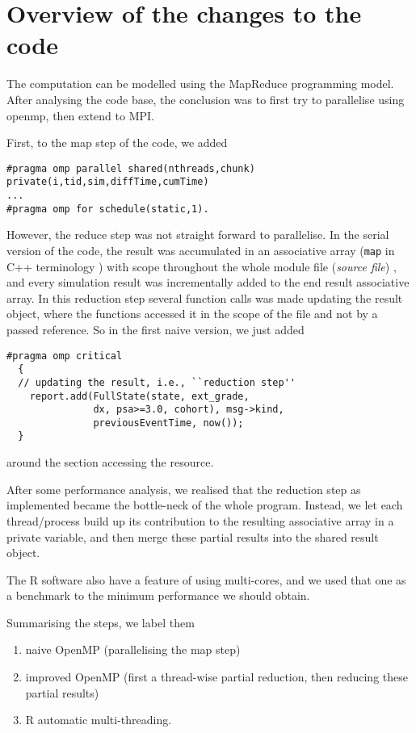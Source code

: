 
\section{Overview of the changes to the code}

The computation can be modelled using the MapReduce programming model. After
analysing the code base, the conclusion was to first try to
parallelise using openmp, then extend to MPI.

First, to the map step of the code, we added
\begin{lstlisting}
#pragma omp parallel shared(nthreads,chunk) private(i,tid,sim,diffTime,cumTime)
...
#pragma omp for schedule(static,1).
\end{lstlisting}
However, the reduce step was not straight forward to parallelise. In
the serial version of the code, the result was accumulated in an
associative array (\texttt{map} in C++ terminology ) with scope
throughout the whole module file (\emph{source file}) , and every
simulation result was incrementally added to the end result
associative array. In this reduction step several function calls was
made updating the result object, where the functions accessed it in
the scope of the file and not by a passed reference. So in the first
naive version, we just added \lstset{language=C++}
\begin{lstlisting}
#pragma omp critical
  {
  // updating the result, i.e., ``reduction step''
    report.add(FullState(state, ext_grade,
               dx, psa>=3.0, cohort), msg->kind,
               previousEventTime, now());
  }
\end{lstlisting}
around the section accessing the resource.

After some performance analysis, we realised that the reduction step
as implemented became the bottle-neck of the whole program. Instead,
we let each thread/process build up its contribution to the resulting
associative array in a private variable, and then merge these partial
results into the shared result object.

The R software also have a feature of using multi-cores, and we used
that one as a benchmark to the minimum performance we should obtain.

Summarising the steps, we label them
\begin{enumerate}
\item naive OpenMP (parallelising the map step)
\item improved OpenMP (first a thread-wise partial reduction, then
  reducing these partial results)
\item R automatic multi-threading.
\end{enumerate}


